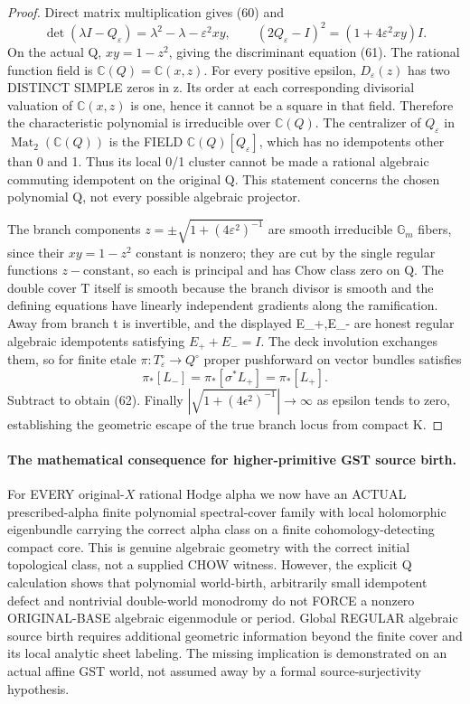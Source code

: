 \documentclass[11pt]{article}
\begin{document}
\begin{proof}
Direct matrix multiplication gives
(60) and
\[
 \det(\lambda I-Q_\varepsilon)
  =\lambda^2-\lambda-\varepsilon^2xy,\qquad
 (2Q_\varepsilon-I)^2
   =(1+4\varepsilon^2xy)I .
\]
On the actual Q, $xy=1-z^2$, giving
the discriminant equation (61).
The rational function field is
$\mathbb C(Q)=\mathbb C(x,z)$.
For every positive epsilon,
$D_\varepsilon(z)$ has two
DISTINCT SIMPLE zeros in z.
Its order at each corresponding
divisorial valuation of
$\mathbb C(x,z)$ is one, hence
it cannot be a square in that
field. Therefore the
characteristic polynomial is
irreducible over $\mathbb C(Q)$.
The centralizer of
$Q_\varepsilon$ in
$\operatorname{Mat}_2(\mathbb C(Q))$
is the FIELD
$\mathbb C(Q)[Q_\varepsilon]$,
which has no idempotents other
than 0 and 1. Thus its local
0/1 cluster cannot be made
a rational algebraic commuting
idempotent on the original Q.
This statement concerns the
chosen polynomial Q, not every
possible algebraic projector.

The branch components
$z=\pm\sqrt{1+(4\varepsilon^2)^{-1}}$
are smooth irreducible
$\mathbb G_m$ fibers, since their
$xy=1-z^2$ constant is
nonzero; they are cut by the
single regular functions
$z-\text{constant}$, so each
is principal and has Chow
class zero on Q.
The double cover T itself
is smooth because the branch
divisor is smooth and the
defining equations have
linearly independent gradients
along the ramification.
Away from branch t is invertible,
and the displayed E_+,E_-
are honest regular algebraic
idempotents satisfying
$E_++E_-=I$.
The deck involution exchanges
them, so for finite etale
$\pi:T_\varepsilon^\circ\to Q^\circ$
proper pushforward on vector
bundles satisfies
\[
 \pi_*[L_-]
  =\pi_*[\sigma^*L_+]
  =\pi_*[L_+] .
\]
Subtract to obtain (62).
Finally $|\sqrt{1+(4\epsilon^2)^{-1}}|
\to\infty$ as epsilon tends
to zero, establishing the
geometric escape of the true
branch locus from compact K.
\end{proof}

\paragraph{The mathematical consequence for higher-primitive GST source birth.}
For EVERY original-$X$ rational Hodge alpha we now have
an ACTUAL prescribed-alpha finite polynomial
spectral-cover family with local holomorphic
eigenbundle carrying the correct alpha class
on a finite cohomology-detecting compact core.
This is genuine algebraic geometry with
the correct initial topological class,
not a supplied CHOW witness.
However, the explicit Q calculation
shows that polynomial world-birth,
arbitrarily small idempotent defect
and nontrivial double-world monodromy
do not FORCE a nonzero ORIGINAL-BASE
algebraic eigenmodule or period.
Global REGULAR algebraic
source birth requires additional
geometric information beyond the
finite cover and its local analytic
sheet labeling. The missing implication
is demonstrated on an actual affine
GST world, not assumed away by
a formal source-surjectivity hypothesis.
\end{document}
